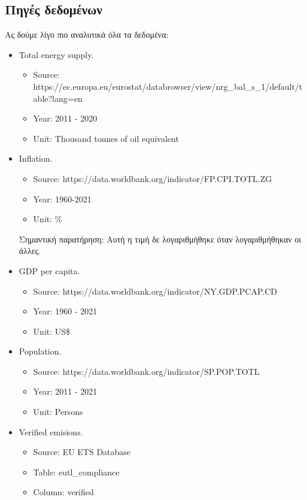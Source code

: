 \documentclass[a4paper,twoside,10pt]{article}
\begin{document}
	\subsection{Πηγές δεδομένων}
	Ας δούμε λίγο πιο αναλυτικά όλα τα δεδομένα:
	\begin{itemize}
		\item Total energy supply.
		\begin{itemize}
			\item Source: https://ec.europa.eu/eurostat/databrowser/view/nrg\_bal\_s\_1/default/table?lang=en
			\item Year: 2011 - 2020
			\item Unit: Thousand tonnes of oil equivalent
		\end{itemize}
		
		\item  Inflation.
		\begin{itemize}
			\item Source: https://data.worldbank.org/indicator/FP.CPI.TOTL.ZG
			\item Year: 1960-2021
			\item Unit: \%
		\end{itemize}
		Σημαντική παρατήρηση: Αυτή η τιμή δε λογαριθμήθηκε όταν λογαριθμήθηκαν οι άλλες.
		
		\item GDP per capita.
		\begin{itemize}
			\item Source: https://data.worldbank.org/indicator/NY.GDP.PCAP.CD
			\item Year: 1960 - 2021
			\item Unit: US\$
		\end{itemize}
		
		\item Population.
		\begin{itemize}
			\item Source: https://data.worldbank.org/indicator/SP.POP.TOTL
			\item Year: 2011 - 2021
			\item Unit: Persons
		\end{itemize}    
		
		\item Verified emisions.
		\begin{itemize}
			\item Source: EU ETS Database
			\item Table: eutl\_compliance
			\item Column: verified
		\end{itemize}    
		

\end{itemize}
\end{document}
